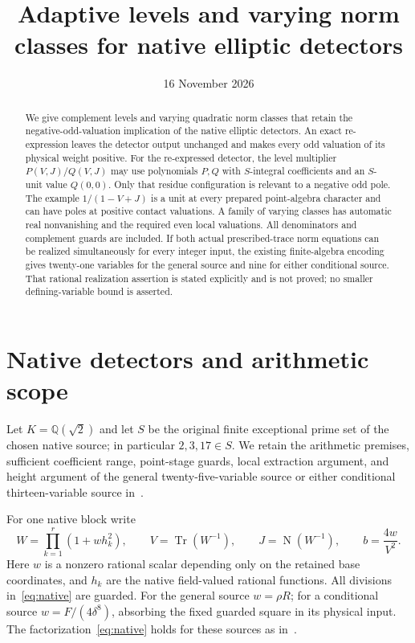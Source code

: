 \documentclass[11pt,a4paper]{article}
\title{Adaptive levels and varying norm classes for native elliptic detectors}
\author{}\date{16 November 2026}
\theoremstyle{definition}\newtheorem{definition}[theorem]{Definition}
\newcommand{\Q}{\mathbb Q}\newcommand{\Z}{\mathbb Z}
\DeclareMathOperator{\Tr}{Tr}\DeclareMathOperator{\Nm}{N}
\begin{document}
\maketitle
\begin{abstract}
We give complement levels and varying quadratic norm classes that retain
the negative-odd-valuation implication of the native elliptic detectors.
An exact re-expression leaves the detector output unchanged and makes
every odd valuation of its physical weight positive. For the re-expressed
detector, the level multiplier $P(V,J)/Q(V,J)$ may use polynomials
$P,Q$ with $S$-integral coefficients and an $S$-unit value $Q(0,0)$.
Only that residue configuration is relevant to a negative odd pole. The example
$1/(1-V+J)$ is a unit at every prepared point-algebra character and
can have poles at positive contact valuations. A family of varying
classes has automatic real nonvanishing and the required even local
valuations. All denominators and complement guards are included.
If both actual prescribed-trace norm equations can be realized
simultaneously for every integer input, the existing finite-algebra
encoding gives twenty-one variables for the general source and nine
for either conditional source. That rational realization assertion is
stated explicitly and is not proved; no smaller defining-variable
bound is asserted.
\end{abstract}

\section{Native detectors and arithmetic scope}

Let $K=\Q(\sqrt2)$ and let $S$ be the original finite exceptional
prime set of the chosen native source; in particular $2,3,17\in S$.
We retain the arithmetic premises, sufficient coefficient range,
point-stage guards, local extraction argument, and height argument of
the general twenty-five-variable source or either conditional
thirteen-variable source in~\cite{Unit,Terminal,Complement}.

For one native block write
\begin{equation}\label{eq:native}
 W=\prod_{k=1}^{r}(1+w h_k^2),\qquad
 V=\Tr(W^{-1}),\qquad J=\Nm(W^{-1}),\qquad b=\frac{4w}{V^2}.
\end{equation}
Here $w$ is a nonzero rational scalar depending only on the retained
base coordinates, and $h_k$ are the native field-valued rational
functions. All divisions in~\eqref{eq:native} are guarded.
For the general source $w=\rho R$; for a conditional source
$w=F/(4\delta^8)$, absorbing the fixed guarded square in its
physical input. The factorization~\eqref{eq:native} holds for these
sources as in~\cite{Bounded}.
\end{document}
